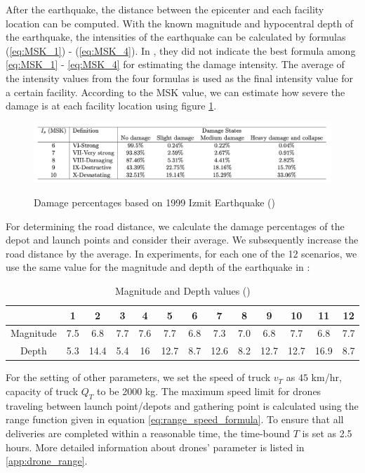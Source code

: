 \documentclass[preprint,review,11pt,authoryear]{elsarticle}
\begin{document}
After the earthquake, the distance between the epicenter and each facility location can be computed. With the known magnitude and hypocentral depth of the earthquake, the intensities of the earthquake can be calculated by formulas (\ref{eq:MSK_1}) - (\ref{eq:MSK_4}). In \cite{erbeyouglu2020earthquake}, they did not indicate the best formula among \eqref{eq:MSK_1} - \eqref{eq:MSK_4} for estimating the damage intensity. The average of the intensity values from the four formulas is used as the final intensity value for a certain facility. According to the MSK value, we can estimate how severe the damage is at each facility location using figure \ref*{fig:MSK_scale}.
\begin{figure}
    \centering
    \includegraphics[width=\textwidth]{eq_tab.png}
    \label{fig:MSK_scale}
    \caption{Damage percentages based on 1999 Izmit Earthquake (\cite{ozmen2002istanbul})}
\end{figure}

For determining the road distance, we calculate the damage percentages of the depot and launch points and consider their average. We subsequently increase the road distance by the average. In experiments, for each one of the 12 scenarios, we use the same value for the magnitude and depth of the earthquake in \cite{dukkanci2023drones}:
\begin{table}[h]
    \centering
    \caption{Magnitude and Depth values (\cite{dukkanci2023drones})}
    \begin{tabular}{|c|c|c|c|c|c|c|c|c|c|c|c|c|}
    \hline
    & 1 & 2 & 3 & 4 & 5 & 6 & 7 & 8 & 9 & 10 & 11 & 12 \\
    \hline
    Magnitude & 7.5 & 6.8 & 7.7 & 7.6 & 7.7 & 6.8 & 7.3 & 7.0 & 6.8 & 7.7 & 6.8 & 7.7 \\
    \hline
    Depth & 5.3 & 14.4 & 5.4 & 16 & 12.7 & 8.7 & 12.6 & 8.2 & 12.7 & 12.7 & 16.9 & 8.7 \\
    \hline
    \end{tabular}
    \label{tab:earthquake_info}
\end{table}
For the setting of other parameters, we set the speed of truck $v_T$ as $45$ km/hr, capacity of truck $Q_T$ to be 2000 kg. The maximum speed limit for drones traveling between launch point/depots and gathering point is calculated using the range function given in equation \eqref{eq:range_speed_formula}. To ensure that all deliveries are completed within a reasonable time, the time-bound $T$ is set as 2.5 hours. More detailed information about drones' parameter is listed in \ref{app:drone_range}.
\end{document}
